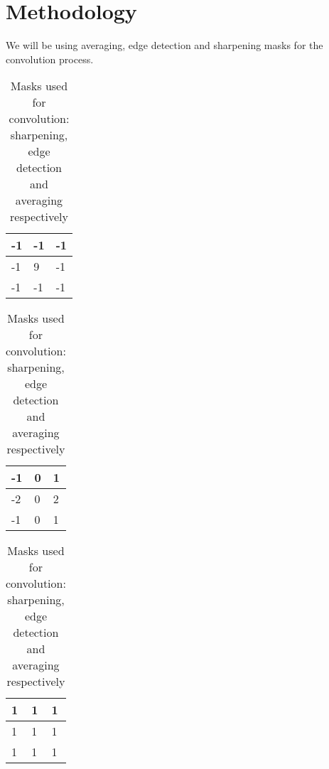 \section{Methodology}
We will be using averaging, edge detection and sharpening masks for the convolution process.
\begin{table}[H]
\centering
\begin{tabular}{|l|l|l|}
\hline
-1 & -1 & -1 \\ \hline
-1 & 9  & -1 \\ \hline
-1 & -1 & -1 \\ \hline
\end{tabular}
\hspace{0.5cm}
\begin{tabular}{|l|l|l|}
\hline
-1 & 0 & 1 \\ \hline
-2 & 0  & 2 \\ \hline
-1 & 0 & 1 \\ \hline
\end{tabular}
\hspace{0.5cm}
\begin{tabular}{|l|l|l|}
\hline
1 & 1 & 1 \\ \hline
1 & 1  & 1 \\ \hline
1 & 1 & 1 \\ \hline
\end{tabular}
\caption{Masks used for convolution: sharpening, edge detection and averaging respectively}
\label{tab:my-table}
\end{table}

